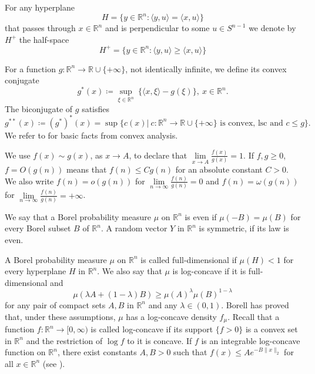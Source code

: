 \documentclass[11pt,a4paper]{article} %
\theoremstyle{definition}
\theoremstyle{remark}
\newcommand{\1}{\mathds{1}}
\newcommand{\ls}{\le}
\newcommand{\gr}{\ge}
\begin{document}
For any hyperplane $$H=\{y \in \mathbb{R}^n: \langle y,u\rangle =\langle x , u \rangle\}$$ that passes through $x \in \mathbb{R}^n$ and is perpendicular to some $u \in S^{n-1}$ we denote by $H^+$ the half-space $$H^+=\{y \in \mathbb{R}^n: \langle y,u\rangle \geq \langle x , u \rangle\}$$

For a function $g: \mathbb{R}^n \to \mathbb{R \cup \{+\infty\}}$, not identically infinite, we define its convex conjugate $$g^\ast(x)\coloneq\sup_{\xi \in \mathbb{R}^n} \ \{  \langle x,\xi\rangle - g(\xi)\}, \ x \in \mathbb{R}^n.$$ The biconjugate of $g$ satisfies $$g^{\ast \ast}(x)\coloneq(g^\ast)^\ast(x)=\sup \{ c(x)| \ c: \mathbb{R}^n \to \mathbb{R} \cup \{+\infty\} \text{ is convex, lsc and } c\leq g  \}.$$ We refer to \cite{Rock} for basic facts from convex analysis.

We use $f(x)\sim g(x)$, as $x \to A$, to declare that  $\lim\limits_{x \to A} \frac{f(x)}{g(x)}=1$. If $f,g \geq 0$, $f=O(g(n))$ means that $f(n) \leq Cg(n)$ for an absolute constant $C>0$. We also write $f(n)=o(g(n))$ for $\lim\limits_{n \to \infty} \frac{f(n)}{g(n)}=0$ and $f(n)=\omega(g(n))$ for $\lim\limits_{n \to \infty} \frac{f(n)}{g(n)}=+\infty$.

We say that a Borel probability measure $\mu $ on $\mathbb{R}^n$ is even if $\mu (-B)=\mu (B)$ for every Borel subset $B$
of ${\mathbb R}^n$. A random vector $Y$ in $\mathbb{R}^n$ is symmetric, if its law is even.  

A Borel probability measure $\mu$ on $\mathbb{R}^n$ is called full-dimensional if $\mu(H)<1$ for every
hyperplane $H$ in ${\mathbb R}^n$. We also say that $\mu$ is log-concave if it is full-dimensional and
$$\mu(\lambda A+(1-\lambda)B) \gr \mu(A)^{\lambda}\mu(B)^{1-\lambda}$$
for any pair of compact sets $A,B$ in ${\mathbb R}^n$ and any $\lambda \in (0,1)$. Borell \cite{Borell-1974} has proved that, under these assumptions, $\mu $ has a log-concave density $f_{{\mu }}$. Recall that a function $f:\mathbb R^n \rightarrow [0,\infty)$ is called log-concave if its support $\{f>0\}$ is a convex set in ${\mathbb R}^n$ and the restriction of $\log{f}$ to it is concave. If $f$ is an integrable log-concave function on $\mathbb{R}^n$, there exist constants $A,B>0$ such that $f(x)\ls Ae^{-B\|x\|_2}$ for all $x\in {\mathbb R}^n$ (see \cite[Lemma~2.2.1]{BGVV-book}).
\end{document}
